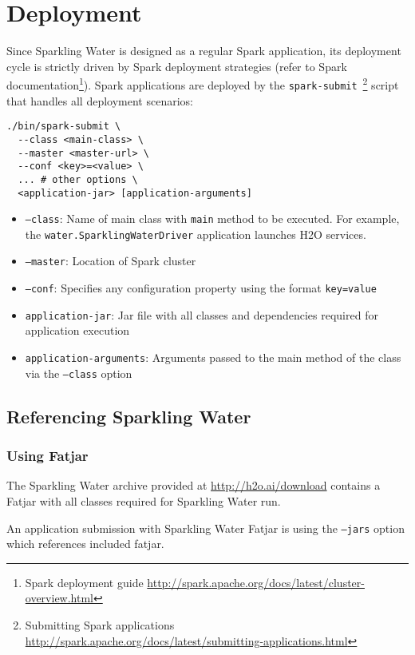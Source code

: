 \section{Deployment}
Since Sparkling Water is designed as a regular Spark application, its deployment cycle is strictly driven by Spark deployment strategies (refer to Spark documentation\footnote{Spark deployment guide \url{http://spark.apache.org/docs/latest/cluster-overview.html}}). Spark applications are deployed by the \texttt{spark-submit}~\footnote{Submitting Spark applications \url{http://spark.apache.org/docs/latest/submitting-applications.html}} script that handles all deployment scenarios:

\begin{lstlisting}[style=Bash]
./bin/spark-submit \
  --class <main-class> \
  --master <master-url> \
  --conf <key>=<value> \
  ... # other options \
  <application-jar> [application-arguments]
\end{lstlisting}

\begin{itemize}
	\item \texttt{--class}: Name of main class with \texttt{main} method to be executed. For example, the \texttt{water.SparklingWaterDriver} application launches H2O services.
	\item \texttt{--master}: Location of Spark cluster
	\item \texttt{--conf}: Specifies any configuration property using the format \texttt{key=value}
	\item \texttt{application-jar}: Jar file with all classes and dependencies required for application execution
	\item \texttt{application-arguments}: Arguments passed to the main method of the class via the \texttt{--class} option
\end{itemize}

\subsection{Referencing Sparkling Water}

\subsubsection{Using Fatjar}
The Sparkling Water archive provided at \url{http://h2o.ai/download} contains a Fatjar with all classes required for Sparkling Water run.

An application submission with Sparkling Water Fatjar is using the \texttt{--jars} option which references included fatjar.

